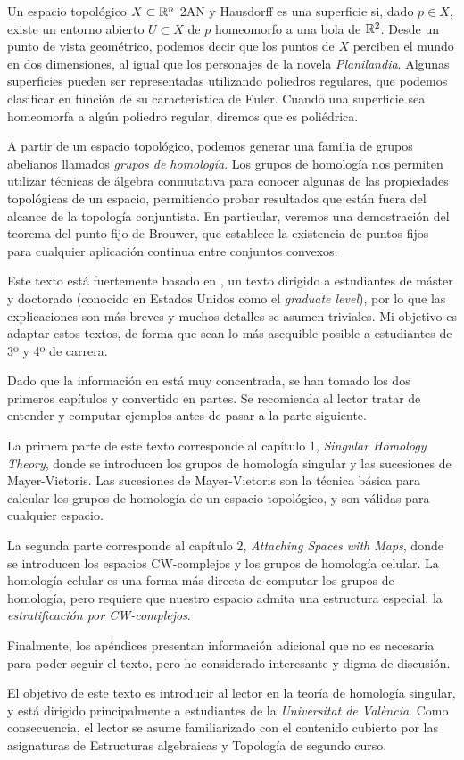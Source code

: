 Un espacio topológico $X \subset \mathbb{R}^n$ 2AN y Hausdorff es una superficie
si, dado $p \in X$, existe un entorno abierto $U \subset X$ de $p$ homeomorfo
a una bola de $\mathbb{R}^2$. Desde un punto de vista geométrico, podemos decir
que los puntos de $X$ perciben el mundo en dos dimensiones, al igual que los
personajes de la novela \emph{Planilandia}. Algunas superficies pueden ser
representadas utilizando poliedros regulares, que podemos clasificar en
función de su característica de Euler. Cuando una superficie sea homeomorfa a
algún poliedro regular, diremos que es poliédrica.

A partir de un espacio topológico, podemos generar una familia de grupos
abelianos llamados \emph{grupos de homología}. Los grupos de homología nos
permiten utilizar técnicas de álgebra conmutativa para conocer algunas de las
propiedades topológicas de un espacio, permitiendo probar resultados que están
fuera del alcance de la topología conjuntista. En particular, veremos una
demostración del teorema del punto fijo de Brouwer, que establece la
existencia de puntos fijos para cualquier aplicación continua entre conjuntos
convexos.

Este texto está fuertemente basado en \cite{Vick94}, un texto dirigido a
estudiantes de máster y doctorado (conocido en Estados Unidos como el
\emph{graduate level}), por lo que las explicaciones son más breves y muchos
detalles se asumen triviales. Mi objetivo es adaptar estos textos, de
forma que sean lo más asequible posible a estudiantes de 3º y 4º de carrera.

Dado que la información en \cite{Vick94} está muy concentrada, se han tomado
los dos primeros capítulos y convertido en partes. Se recomienda al lector
tratar de entender y computar ejemplos antes de pasar a la parte siguiente.

La primera parte de este texto corresponde al capítulo 1, \emph{Singular
Homology Theory}, donde se introducen los grupos de homología singular y las
sucesiones de Mayer-Vietoris. Las sucesiones de Mayer-Vietoris son la técnica
básica para calcular los grupos de homología de un espacio topológico, y
son válidas para cualquier espacio.

La segunda parte corresponde al capítulo 2, \emph{Attaching Spaces with Maps},
donde se introducen los espacios CW-complejos y los grupos de homología
celular. La homología celular es una forma más directa de computar los grupos
de homología, pero requiere que nuestro espacio admita una estructura especial,
la \emph{estratificación por CW-complejos}.

Finalmente, los apéndices presentan información adicional que no es necesaria
para poder seguir el texto, pero he considerado interesante y digma de
discusión.

El objetivo de este texto es introducir al lector en la teoría de homología
singular, y está dirigido principalmente a estudiantes de la \emph{Universitat
de València}. Como consecuencia, el lector se asume familiarizado con el
contenido cubierto por las asignaturas de Estructuras algebraicas y Topología
de segundo curso.
